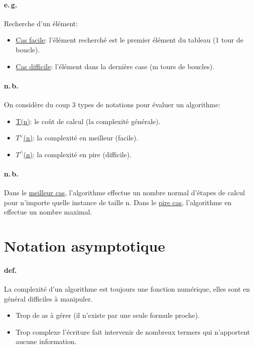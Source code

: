 \documentclass{report}
\begin{document}
    \paragraph{e.\,g.} Recherche d'un élément:
    \begin{itemize}
      \item \underline{Cas facile}: l'élément recherché est le premier élément du tableau (1 tour de boucle).
      \item \underline{Cas difficile}: l'élément dans la dernière case (m tours de boucles).
    \end{itemize}

    \paragraph{n.\,b.} On considère du coup 3 types de notations pour évaluer un algorithme:
    \begin{itemize}
      \item \underline{T(n)}: le coût de calcul (la complexité générale).
      \item \underline{$T^{\lor}$(n)}: la complexité en meilleur (facile).
      \item \underline{$T^{\land}$(n)}: la complexité en pire (difficile).
    \end{itemize}

    \paragraph{n.\,b.} Dans le \underline{meilleur cas}, l'algorithme effectue un nombre normal d'étapes de calcul pour n'importe quelle instance de taille n. Dans le \underline{pire cas}, l'algorithme en effectue un nombre maximal.

  \section{Notation asymptotique}

    \paragraph{def.} La complexité d'un algorithme est toujours une fonction numérique, elles sont en général difficiles à manipuler.
    \begin{itemize}
      \item Trop de as à gérer (il n'existe par une seule formule proche).
      \item Trop complexe l'écriture fait intervenir de nombreux termers qui n'apportent aucune information.
    \end{itemize}
\end{document}
